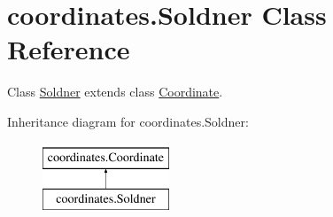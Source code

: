 \hypertarget{classcoordinates_1_1_soldner}{}\section{coordinates.\+Soldner Class Reference}
\label{classcoordinates_1_1_soldner}


Class \hyperlink{classcoordinates_1_1_soldner}{Soldner} extends class \hyperlink{classcoordinates_1_1_coordinate}{Coordinate}.  


Inheritance diagram for coordinates.\+Soldner\+:\begin{figure}[H]
\begin{center}
\leavevmode
\includegraphics[height=2.000000cm]{classcoordinates_1_1_soldner}
\end{center}
\end{figure}

